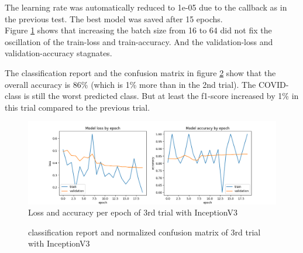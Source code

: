 \documentclass{article}
\begin{document}
The learning rate was automatically reduced to 1e-05 due to the callback as in the previous test. The best model was saved after 15 epochs. \\
Figure \ref{fig:inceptionv3_06_loss_accuracy} shows that increasing the batch size from 16 to 64 did not fix the oscillation of the train-loss and train-accuracy. And the validation-loss and validation-accuracy stagnates. 

The classification report and the confusion matrix in figure \ref{fig:inceptionv3_06_results} show that the overall accuracy is 86\%  (which is 1\% more than in the 2nd trial). The COVID-class is still the worst predicted class. But at least the f1-score increased by 1\% in this trial compared to the previous trial. 

\begin{figure}[ht] %
    \centering
    \includegraphics[width=1.0\linewidth]{inceptionv3_06_loss_accuracy.png}
    \caption{Loss and accuracy per epoch of 3rd trial with InceptionV3}
    \label{fig:inceptionv3_06_loss_accuracy}
\end{figure}

\begin{figure}[!ht]
  \centering
  \qquad
  \caption{classification report and normalized confusion matrix of 3rd trial with InceptionV3}
  \label{fig:inceptionv3_06_results}
\end{figure}
\end{document}
